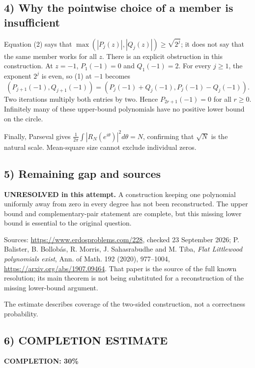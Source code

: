 \subsection*{4) Why the pointwise choice of a member is insufficient}
Equation (2) says that $\max(|P_j(z)|,|Q_j(z)|)\ge\sqrt{2^j}$; it does not say that the same member works for all $z$. There is an explicit obstruction in this construction. At $z=-1$, $P_1(-1)=0$ and $Q_1(-1)=2$. For every $j\ge1$, the exponent $2^j$ is even, so (1) at $-1$ becomes
\[
 (P_{j+1}(-1),Q_{j+1}(-1))
 =(P_j(-1)+Q_j(-1),P_j(-1)-Q_j(-1)).
\]
Two iterations multiply both entries by two. Hence $P_{2r+1}(-1)=0$ for all $r\ge0$. Infinitely many of these upper-bound polynomials have no positive lower bound on the circle.

Finally, Parseval gives $\frac1{2\pi}\int|R_N(e^{i\theta})|^2d\theta=N$, confirming that $\sqrt N$ is the natural scale. Mean-square size cannot exclude individual zeros.

\subsection*{5) Remaining gap and sources}
\textbf{UNRESOLVED in this attempt.} A construction keeping one polynomial uniformly away from zero in every degree has not been reconstructed. The upper bound and complementary-pair statement are complete, but this missing lower bound is essential to the original question.

Sources: \url{https://www.erdosproblems.com/228}, checked 23 September 2026; P. Balister, B. Bollob\'as, R. Morris, J. Sahasrabudhe and M. Tiba, \emph{Flat Littlewood polynomials exist}, Ann. of Math. 192 (2020), 977--1004, \url{https://arxiv.org/abs/1907.09464}. That paper is the source of the full known resolution; its main theorem is not being substituted for a reconstruction of the missing lower-bound argument.

The estimate describes coverage of the two-sided construction, not a correctness probability.
\subsection*{6) COMPLETION ESTIMATE}
\textbf{COMPLETION: 30\%}
